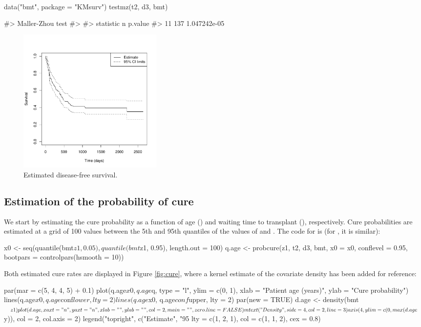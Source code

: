 \begin{example}
data("bmt", package = "KMsurv")
testmz(t2, d3, bmt)
\end{example}
\begin{example}
#> Maller-Zhou test 
#>
#> statistic   n      p.value
#>        11 137 1.047242e-05
\end{example}

\begin{figure}[htbp]
  \centering
  \includegraphics[width=7.2cm, height=7.2cm]{Figure-033}
  \caption{Estimated disease-free survival.}
  \label{fig:KM} 
\end{figure}

\subsection{Estimation of the probability of cure}

We start by estimating the cure probability as a function of age () and waiting time to transplant (), respectively. Cure probabilities are estimated at a grid of 100 values between the 5th and 95th quantiles of the values of  and . The code for  is (for , it is similar):

\begin{example}
x0 <- seq(quantile(bmt$z1, 0.05), quantile(bmt$z1, 0.95), length.out = 100)
q.age <- probcure(z1, t2, d3, bmt, x0 = x0, conflevel = 0.95,
   bootpars = controlpars(hsmooth = 10))
\end{example}
   
Both estimated cure rates are displayed in Figure \ref{fig:cure}, where a kernel estimate of the covariate density has been added for reference:

\begin{example}
par(mar = c(5, 4, 4, 5) + 0.1)
plot(q.age$x0, q.age$q, type = "l", ylim = c(0, 1),
   xlab = "Patient age (years)", ylab = "Cure probability")
lines(q.age$x0, q.age$conf$lower, lty = 2)
lines(q.age$x0, q.age$conf$upper, lty = 2)
par(new = TRUE)
d.age <- density(bmt$z1)
plot(d.age, xaxt = "n", yaxt = "n", xlab = "", ylab = "", col = 2,
   main = "", zero.line = FALSE)
mtext("Density", side = 4, col = 2, line = 3) 
axis(4, ylim = c(0, max(d.age$y)), col = 2, col.axis = 2)
legend("topright", c("Estimate", "95%
   lty = c(1, 2, 1), col = c(1, 1, 2), cex = 0.8)
\end{example}

